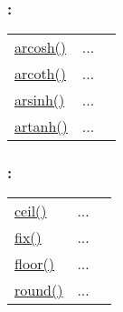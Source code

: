 \subsubsection*{: }

\textcolor{blue}{}\begin{tabular}{>{\raggedleft}p{3cm}>{\centering}p{0.5cm}l}
\textcolor{blue}{\hyperlink{arcosh}{arcosh()}}&
...&
 \begin{NoHyper} \nameref{par:Hyperbolic-area-cosine} \end{NoHyper}\tabularnewline
\textcolor{blue}{\hyperlink{arcoth}{arcoth()}}&
...&
 \begin{NoHyper} \nameref{par:Hyperbolic-area-cotangent} \end{NoHyper}\tabularnewline
\textcolor{blue}{\hyperlink{arsinh}{arsinh()}}&
...&
 \begin{NoHyper} \nameref{par:Hyperbolic-area-sine} \end{NoHyper}\tabularnewline
\textcolor{blue}{\hyperlink{artanh}{artanh()}}&
...&
 \begin{NoHyper} \nameref{par:Hyperbolic-area-tangent} \end{NoHyper}\tabularnewline
\end{tabular}


\subsubsection*{: }

\textcolor{blue}{}\begin{tabular}{>{\raggedleft}p{3cm}>{\centering}p{0.5cm}l}
\textcolor{blue}{\hyperlink{ceil}{ceil()}}&
...&
 \begin{NoHyper} \nameref{par:ceil} \end{NoHyper}\tabularnewline
\textcolor{blue}{\hyperlink{fix}{fix()}}&
...&
 \begin{NoHyper} \nameref{par:fix} \end{NoHyper}\tabularnewline
\textcolor{blue}{\hyperlink{floor}{floor()}}&
...&
 \begin{NoHyper} \nameref{par:floor} \end{NoHyper}\tabularnewline
\textcolor{blue}{\hyperlink{round}{round()}}&
...&
 \begin{NoHyper} \nameref{par:round} \end{NoHyper}\tabularnewline
\end{tabular}


